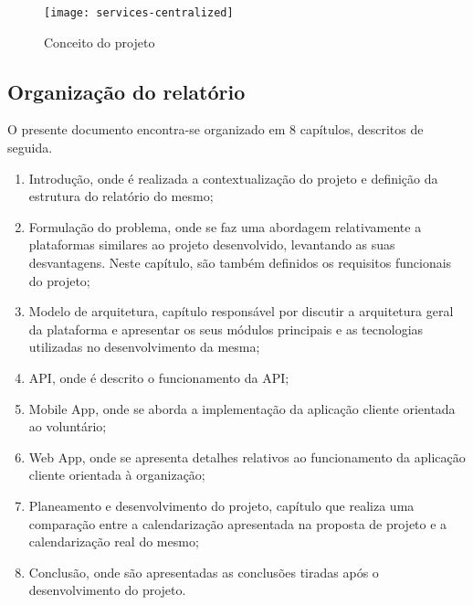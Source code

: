 \bigskip \bigskip \bigskip

\begin{figure}[h]
	\centering
	\texttt{[image: services-centralized]}
	\caption{Conceito do projeto}
\end{figure}

\subsection{Organização do relatório}

O presente documento encontra-se organizado em 8 capítulos, descritos de seguida.
\begin{enumerate}
	\item Introdução, onde é realizada a contextualização do projeto e definição da estrutura do relatório do mesmo;
	\item Formulação do problema, onde se faz uma abordagem relativamente a plataformas similares ao projeto desenvolvido, levantando as suas desvantagens. Neste capítulo, são também definidos os requisitos funcionais do projeto;
	\item Modelo de arquitetura, capítulo responsável por discutir a arquitetura geral da plataforma e apresentar os seus módulos principais e as tecnologias utilizadas no desenvolvimento da mesma;
	\item API, onde é descrito o funcionamento da API;
	\item Mobile App, onde se aborda a implementação da aplicação cliente orientada ao voluntário;
	\item Web App, onde se apresenta detalhes relativos ao funcionamento da aplicação cliente orientada à organização;
	\item Planeamento e desenvolvimento do projeto, capítulo que realiza uma comparação entre a calendarização apresentada na proposta de projeto e a calendarização real do mesmo;
	\item Conclusão, onde são apresentadas as conclusões tiradas após o desenvolvimento do projeto.
\end{enumerate}
























